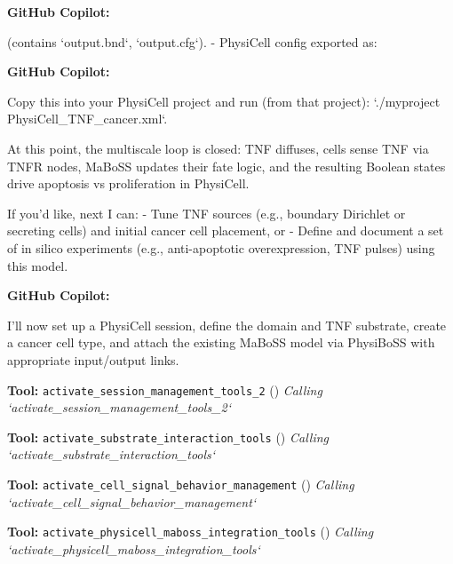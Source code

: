 \documentclass[11pt,a4paper]{article}
\begin{document}
\begin{copilotbox}
\textbf{GitHub Copilot:}

(contains `output.bnd`, `output.cfg`).
  - PhysiCell config exported as:

\end{copilotbox}
\begin{copilotbox}
\textbf{GitHub Copilot:}

Copy this into your PhysiCell project and run (from that project): `./myproject PhysiCell\_TNF\_cancer.xml`.

At this point, the multiscale loop is closed: TNF diffuses, cells sense TNF via TNFR nodes, MaBoSS updates their fate logic, and the resulting Boolean states drive apoptosis vs proliferation in PhysiCell.

If you’d like, next I can:
- Tune TNF sources (e.g., boundary Dirichlet or secreting cells) and initial cancer cell placement, or
- Define and document a set of in silico experiments (e.g., anti-apoptotic overexpression, TNF pulses) using this model.

\end{copilotbox}
\begin{copilotbox}
\textbf{GitHub Copilot:}

I'll now set up a PhysiCell session, define the domain and TNF substrate, create a cancer cell type, and attach the existing MaBoSS model via PhysiBoSS with appropriate input/output links.

\end{copilotbox}
\begin{toolokbox}
\textbf{Tool:} \texttt{activate\_session\_management\_tools\_2} (\checkmark)
\textit{Calling `activate\_session\_management\_tools\_2`}
\end{toolokbox}
\begin{toolokbox}
\textbf{Tool:} \texttt{activate\_substrate\_interaction\_tools} (\checkmark)
\textit{Calling `activate\_substrate\_interaction\_tools`}
\end{toolokbox}
\begin{toolokbox}
\textbf{Tool:} \texttt{activate\_cell\_signal\_behavior\_management} (\checkmark)
\textit{Calling `activate\_cell\_signal\_behavior\_management`}
\end{toolokbox}
\begin{toolokbox}
\textbf{Tool:} \texttt{activate\_physicell\_maboss\_integration\_tools} (\checkmark)
\textit{Calling `activate\_physicell\_maboss\_integration\_tools`}
\end{toolokbox}
\end{document}
